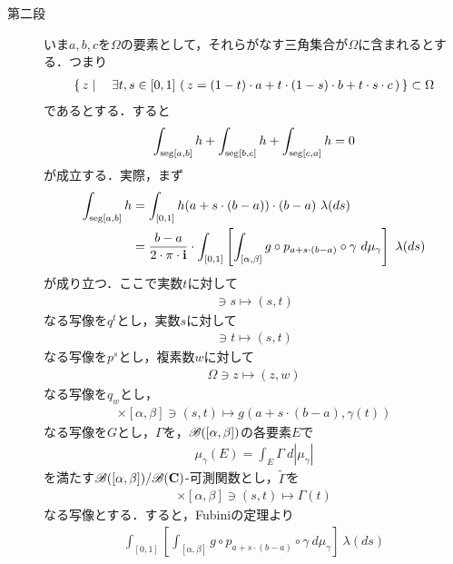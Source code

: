 \begin{sketch}[大雑把]
\begin{description}
			\item[第二段]
				いま$a,b,c$を$\Omega$の要素として，それらがなす三角集合が$\Omega$に含まれるとする．つまり
				\begin{align}
					\left\{\, z \mid \quad \exists t,s \in [0,1]\, 
					\left(\, z = (1-t) \cdot a 
					+ t \cdot (1-s) \cdot b 
					+ t \cdot s \cdot c\, \right)\, \right\} \subset \Omega
				\end{align}
				であるとする．すると
				\begin{align}
					\int_{\operatorname{seg}[a,b]} h + \int_{\operatorname{seg}[b,c]} h + \int_{\operatorname{seg}[c,a]} h = 0
				\end{align}
				が成立する．実際，まず
				\begin{align}
					\int_{\seg{a}{b}} h
					&= \int_{[0,1]} h(a+s \cdot (b-a)) \cdot (b-a)\ \lambda(ds) \\
					&= \frac{b-a}{2\cdot\pi\cdot\isym} \cdot \int_{[0,1]}
					\left[\int_{[\alpha,\beta]} g \circ p_{a+s \cdot (b-a)} \circ \gamma\ d\mu_{\gamma}\right]\ \lambda(ds)
				\end{align}
				が成り立つ．ここで実数$t$に対して
				\begin{align}
					[0,1] \ni s \longmapsto (s,t)
				\end{align}
				なる写像を$q^{t}$とし，実数$s$に対して
				\begin{align}
					[\alpha,\beta] \ni t \longmapsto (s,t)
				\end{align}
				なる写像を$p^{s}$とし，複素数$w$に対して
				\begin{align}
					\Omega \ni z \longmapsto (z,w)
				\end{align}
				なる写像を$q_{w}$とし，
				\begin{align}
					[0,1] \times [\alpha,\beta] \ni (s,t) \longmapsto g(a + s \cdot (b-a),\gamma(t))
				\end{align}
				なる写像を$G$とし，$\Gamma$を，$\mathscr{B}([\alpha,\beta])$の各要素$E$で
				\begin{align}
					\mu_{\gamma}(E) = \int_{E} \Gamma\ d|\mu_{\gamma}|
				\end{align}
				を満たす$\mathscr{B}([\alpha,\beta])/\mathscr{B}(\mathbf{C})$-可測関数とし，$\tilde{\Gamma}$を
				\begin{align}
					[0,1] \times [\alpha,\beta] \ni (s,t) \longmapsto \Gamma(t)
				\end{align}
				なる写像とする．すると，Fubiniの定理より
				\begin{align}
					\int_{[0,1]}
					\left[\int_{[\alpha,\beta]} g \circ p_{a+s \cdot (b-a)} \circ \gamma\ d\mu_{\gamma}\right]\ \lambda(ds)

\end{align}
\end{description}
\end{sketch}

